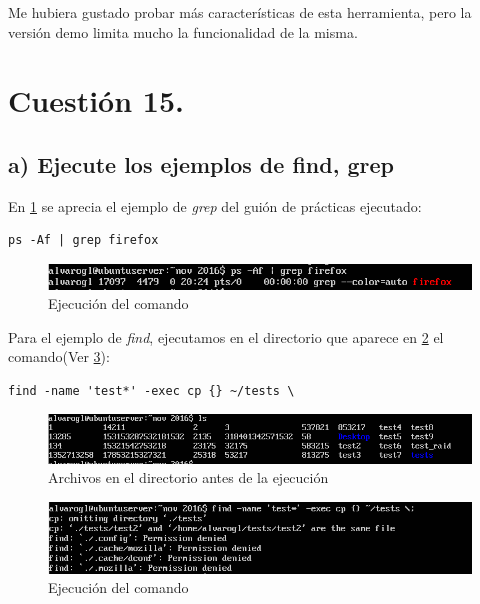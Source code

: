 Me hubiera gustado probar más características de esta herramienta, pero la versión demo limita mucho la funcionalidad de la misma.

\section{Cuestión 15.}

\subsection{a) Ejecute los ejemplos de find, grep}

En \ref{grepfirefox} se aprecia el ejemplo de \textit{grep} del guión de prácticas ejecutado:

\begin{verbatim}
ps -Af | grep firefox
\end{verbatim}

\begin{figure}[H]
	\centering
	\includegraphics[scale=0.6]{grepfirefox.png}
	\caption{Ejecución del comando } \label{grepfirefox}
\end{figure}

Para el ejemplo de \textit{find}, ejecutamos en el directorio que aparece en \ref{archivosfind} el comando(Ver \ref{findexec}):

\begin{verbatim}
find -name 'test*' -exec cp {} ~/tests \
\end{verbatim}

\begin{figure}[H]
	\centering
	\includegraphics[scale=0.6]{archivosfind.png}
	\caption{Archivos en el directorio antes de la ejecución} \label{archivosfind}
\end{figure}

\begin{figure}[H]
	\centering
	\includegraphics[scale=0.6]{findexec.png}
	\caption{Ejecución del comando} \label{findexec}
\end{figure}

